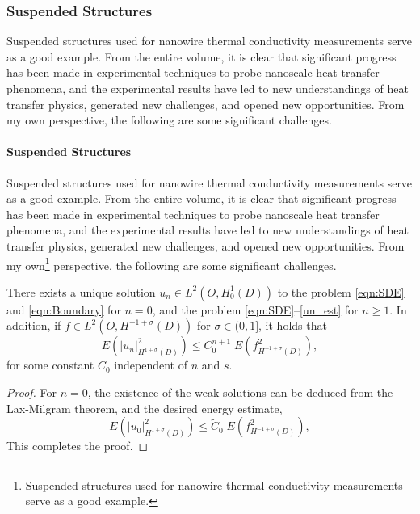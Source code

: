 \documentclass[article,authoryear,jfv]{beg_32}             %
\begin{document}
\subsubsection{Suspended Structures}

Suspended structures used for nanowire
thermal conductivity measurements serve as a good example.
From the entire volume, it is clear that significant progress has been made
in experimental techniques to probe nanoscale heat transfer phenomena, and
the experimental results have led to new understandings of heat transfer
physics, generated new challenges, and opened new opportunities. From my own
perspective, the following are some significant challenges.

\paragraph{Suspended Structures}

Suspended structures used for nanowire
thermal conductivity measurements serve as a good example.
From the entire volume, it is clear that significant progress has been made
in experimental techniques to probe nanoscale heat transfer phenomena, and
the experimental results have led to new understandings of heat transfer
physics, generated new challenges, and opened new opportunities. From my own\footnote{Suspended structures used for nanowire
thermal conductivity measurements serve as a good example.}
perspective, the following are some significant challenges.

\begin{theorem}\label{un_energy}
There exists a unique solution $u_n \in L^2\left(O, H_0^1\left(D\right)\right)$ to the problem \eqref{eqn:SDE} and \eqref{eqn:Boundary} for $n=0$,
and the problem \eqref{eqn:SDE}--\eqref{un_est} for $n\geq 1$. In addition, if $f\in L^2\left(O, H^{-1+\sigma}\left(D\right)\right)$ for $\sigma\in(0,1]$, it holds that
\begin{equation}\label{un_est}
E(|{u_n}|_{H^{1+\sigma}(D)}^2) \leq  C_0^{n+1} \;E({f}_{H^{-1+\sigma}(D)}^2),
\end{equation}
for some constant $C_0$ independent of $n$ and $s$.
\end{theorem}


\begin{proof}
For $n=0$, the existence of the weak solutions can be deduced from the Lax-Milgram theorem,
and the desired energy estimate,
\begin{equation*}
E(|{u_0}|_{H^{1+\sigma}(D)}^2) \leq  \tilde C_0\;E({f}_{H^{-1+\sigma}(D)}^2),
\end{equation*}
This completes the proof.
\end{proof}
\end{document}
